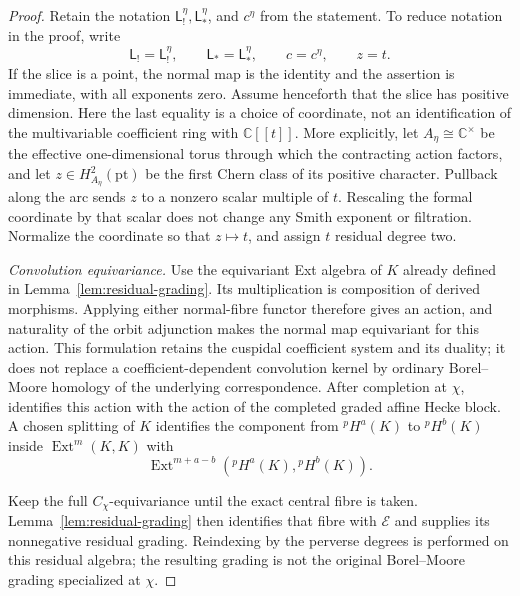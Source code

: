\documentclass[10pt,a4paper]{amsart}
\begin{document}
\begin{proof}
Retain the notation $\mathsf L_!^\eta,\mathsf L_*^\eta$, and $c^\eta$ from
the statement.  To reduce notation in the proof, write
\[
 \mathsf L_!=\mathsf L_!^\eta,\qquad
 \mathsf L_*=\mathsf L_*^\eta,\qquad
 c=c^\eta,\qquad z=t.
\]
If the slice is a point, the normal map is the identity and the assertion
is immediate, with all exponents zero.  Assume henceforth that the slice
has positive dimension.  Here the last equality is a choice of coordinate, not an identification of
the multivariable coefficient ring with $\mathbb C[[t]]$.  More explicitly,
let $A_\eta\cong\mathbb C^\times$ be the effective one-dimensional torus
through which the contracting action factors, and let
$z\in H_{A_\eta}^2(\mathrm{pt})$ be the first Chern class of its positive
character.  Pullback along the arc sends $z$ to a nonzero scalar multiple of
$t$.  Rescaling the formal coordinate by that scalar does not change any
Smith exponent or filtration.  Normalize the coordinate so that $z\mapsto t$,
and assign $t$ residual degree two.

\smallskip
\noindent\emph{Convolution equivariance.}
Use the equivariant Ext algebra of $K$ already defined in
Lemma~\ref{lem:residual-grading}.  Its multiplication is composition
of derived morphisms.  Applying either normal-fibre functor therefore
gives an action, and naturality of the orbit adjunction makes the
normal map equivariant for this action.  This formulation retains the
cuspidal coefficient system and its duality; it does not replace a
coefficient-dependent convolution kernel by ordinary Borel--Moore
homology of the underlying correspondence.  After completion at $\chi$,
\cite[Theorem~2.5]{Solleveld} identifies this action with the action of the
completed graded affine Hecke block.  A chosen
splitting of $K$ identifies the component from ${}^pH^a(K)$ to
${}^pH^b(K)$ inside $\operatorname{Ext}^m(K,K)$ with
\[
 \operatorname{Ext}^{m+a-b}({}^pH^a(K),{}^pH^b(K)).
\]

Keep the full $C_\chi$-equivariance until the exact central fibre is taken.
Lemma~\ref{lem:residual-grading} then identifies that fibre with
$\mathcal E$ and supplies its nonnegative residual grading.  Reindexing by
the perverse degrees is performed on this residual algebra; the resulting
grading is not the original Borel--Moore grading specialized at $\chi$.


\end{proof}
\end{document}
